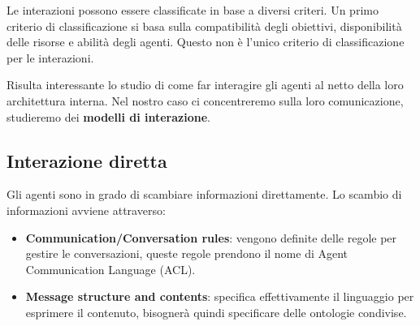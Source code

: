Le interazioni possono essere classificate in base a diversi criteri. Un primo
criterio di classificazione si basa sulla compatibilità degli obiettivi,
disponibilità delle risorse e abilità degli agenti. Questo non è l'unico criterio
di classificazione per le interazioni.

Risulta interessante lo studio di come far interagire gli agenti al netto della
loro architettura interna. Nel nostro caso ci concentreremo sulla loro
comunicazione, studieremo dei \textbf{modelli di interazione}.

\subsection{Interazione diretta}
Gli agenti sono in grado di scambiare informazioni direttamente. Lo scambio di
informazioni avviene attraverso:
\begin{itemize}
    \item \textbf{Communication/Conversation rules}: vengono definite delle
          regole per gestire le conversazioni, queste regole prendono il nome di
          Agent Communication Language (ACL).
    \item \textbf{Message structure and contents}: specifica effettivamente il
          linguaggio per esprimere il contenuto, bisognerà quindi specificare
          delle ontologie condivise.
\end{itemize}

